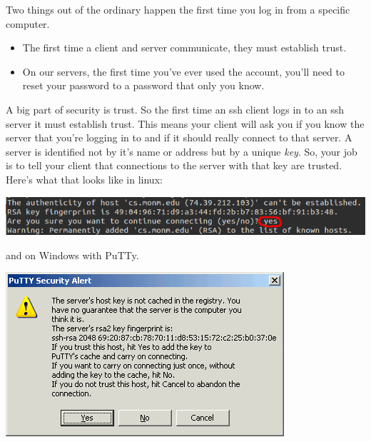 \documentclass[]{tufte-handout}
\begin{document}
Two things out of the ordinary happen the first time you log in from a specific computer.  
\begin{itemize}
\item The first time a client and server communicate, they must establish trust.
\item On our servers, the first time you've ever used the account, you'll need to reset your password to a password that only you know. 
\end{itemize}

A big part of security is trust. So the first time an ssh client logs in to an ssh server it must establish trust.  This means your client will ask you if you know the server that you're logging in to and if it should really connect to that server. A server is identified not by it's name or address but by a unique \textit{key}. So, your job is to tell your client that connections to the server with that key are trusted.  Here's what that looks like in linux:

\vspace{.1in}
\begin{center}
\includegraphics[scale=.5]{linux-knownhost.png}
\end{center}
\vspace{.1in}


and on Windows with PuTTy.

\vspace{.1in}
\begin{center}
\includegraphics[scale=.5]{putty-host-key-warning.png}
\end{center}
\vspace{.1in}
\end{document}
